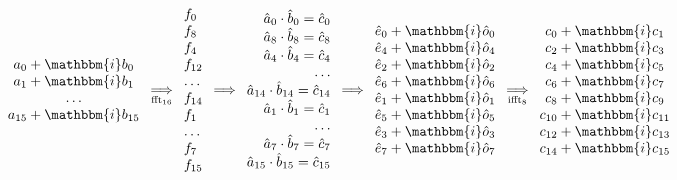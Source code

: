 \documentclass[12 pt]{amsart}
\newcommand{\ii}[0] {\mathbbm{i}}
\begin{document}
\begin{equation*}
\begin{array}{c}
a_0 + \ii b_0\\
a_1 + \ii b_1\\
\dots\\
a_{15} + \ii b_{15}\\
\end{array}
\underset{\operatorname{fft}_{16}}{\Longrightarrow}
\begin{array}{l}
{f}_{0}\\
{f}_{8}\\
{f}_{4}\\
{f}_{12}\\
\dots\\
{f}_{14}\\
{f}_{1}\\
\dots\\
{f}_{7}\\
{f}_{15}\end{array}
\Longrightarrow
\begin{array}{r}
\hat{a}_{0} \cdot \hat{b}_{0} = \hat{c}_{0}\\
\hat{a}_{8} \cdot \hat{b}_{8} = \hat{c}_{8}\\
\hat{a}_{4} \cdot \hat{b}_{4} = \hat{c}_{4}\\
\dots\\
\hat{a}_{14} \cdot \hat{b}_{14} = \hat{c}_{14}\\
\hat{a}_{1} \cdot \hat{b}_{1} = \hat{c}_{1}\\
\dots\\
\hat{a}_{7} \cdot \hat{b}_{7} = \hat{c}_{7}\\
\hat{a}_{15} \cdot \hat{b}_{15} = \hat{c}_{15}\end{array}
\Longrightarrow
\begin{array}{c}
\hat{e}_{0} + \ii \hat{o}_{0}\\
\hat{e}_{4} + \ii \hat{o}_{4}\\
\hat{e}_{2} + \ii \hat{o}_{2}\\
\hat{e}_{6} + \ii \hat{o}_{6}\\
\hat{e}_{1} + \ii \hat{o}_{1}\\
\hat{e}_{5} + \ii \hat{o}_{5}\\
\hat{e}_{3} + \ii \hat{o}_{3}\\
\hat{e}_{7} + \ii \hat{o}_{7}\end{array}
\underset{\operatorname{ifft}_8}{\Longrightarrow}
\begin{array}{c}
c_0 + \ii c_1\\
c_2 + \ii c_3\\
c_4 + \ii c_5\\
c_6 + \ii c_7\\
c_8 + \ii c_9\\
c_{10} + \ii c_{11}\\
c_{12} + \ii c_{13}\\
c_{14} + \ii c_{15}
\end{array}
\end{equation*}
\end{document}
